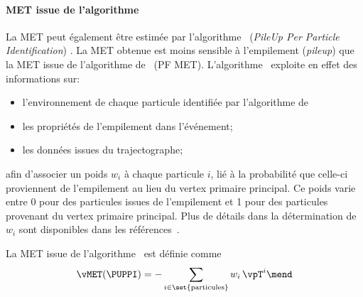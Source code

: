 \paragraph{MET issue de l'algorithme \PUPPI}
La MET peut également être estimée par l'algorithme \PUPPI\ (\emph{PileUp Per Particle Identification}) \cite{PUPPI}.
La \og \PUPPI MET \fg{} obtenue est moins sensible à l'empilement (\emph{pileup}) que la MET issue de l'algorithme de \PF\ (PF MET).
L'algorithme \PUPPI\ exploite en effet des informations sur:
\begin{itemize}
\item l'environnement de chaque particule identifiée par l'algorithme de \PF\;
\item les propriétés de l'empilement dans l'événement;
\item les données issues du trajectographe;
\end{itemize}
afin d'associer un poids $w_i$ à chaque particule $i$, lié à la probabilité que celle-ci proviennent de l'empilement au lieu du vertex primaire principal.
Ce poids varie entre
\num{0} pour des particules issues de l'empilement
et
\num{1} pour des particules provenant du vertex primaire principal.
Plus de détails dans la détermination de $w_i$ sont disponibles dans les références~\cite{CMS-PAS-JME-17-001,PUPPI}.
\par La MET issue de l'algorithme \PUPPI\ est définie comme
\begin{equation}
\vMET(\text{\PUPPI}) = -\sum_{i\in\set{\text{particules}}} w_i\,\vpT^{i}
\mend
\end{equation}